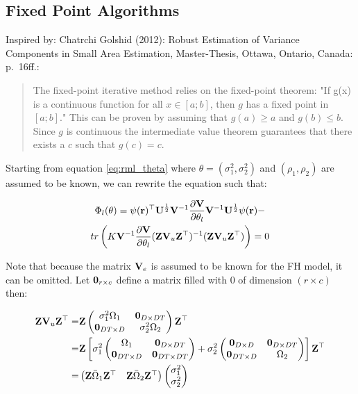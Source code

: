 \subsection{Fixed Point Algorithms}\label{fixed-point-algorithms}

Inspired by: Chatrchi Golshid (2012): Robust Estimation of Variance
Components in Small Area Estimation, Master-Thesis, Ottawa, Ontario,
Canada: p.~16ff.:

\begin{quote}
The fixed-point iterative method relies on the fixed-point theorem: "If g(x) is
a continuous function for all $x \in [a; b]$, then $g$ has a fixed point in $[a;
b]$." This can be proven by assuming that $g(a)\geq a$ and $g(b)\leq b$. Since
$g$ is continuous the intermediate value theorem guarantees that there exists a
$c$ such that $g(c) = c$.
\end{quote}

Starting from equation \ref{eq:rml_theta} where
$\theta = (\sigma_1^2,  \sigma_2^2)$ and $(\rho_1, \rho_2)$ are assumed
to be known, we can rewrite the equation such that:

\begin{multline}
\label{eq:rml_theta_fp}
\Phi_l(\theta) = \psi(\mathbf{r})^\top\mathbf{U}^{\frac{1}{2}}\mathbf{V}^{-1}
\frac{\partial\mathbf{V}}{\partial\theta_l}
\mathbf{V}^{-1}\mathbf{U}^{\frac{1}{2}} \psi(\mathbf{r}) -\\
tr\left(K\mathbf{V}^{-1}\frac{\partial\mathbf{V}}{\partial\theta_l}
(\mathbf{Z}\mathbf{V}_u\mathbf{Z}^\top)^{-1} (\mathbf{Z}\mathbf{V}_u\mathbf{Z}^\top)\right) = 0
\end{multline}

Note that because the matrix $\mathbf{V}_e$ is assumed to be known for the
FH model, it can be omitted. Let $\mathbf{0}_{r\times c}$ define a matrix
filled with $0$ of dimension $(r \times c)$ then:

\begin{align*}
\mathbf{Z}\mathbf{V}_u\mathbf{Z}^\top =& \mathbf{Z}\left(\begin{matrix}
\sigma_1^2\Omega_1 & \mathbf{0}_{D\times DT}\\
\mathbf{0}_{DT\times D} &  \sigma_2^2\Omega_2
\end{matrix}\right)\mathbf{Z}^\top \\
=& \mathbf{Z}
\left[
\sigma_1^2\left(\begin{matrix}
\Omega_1 & \mathbf{0}_{D\times DT} \\
\mathbf{0}_{DT\times D} &  \mathbf{0}_{DT\times DT}
\end{matrix}\right) + 
\sigma_2^2\left(\begin{matrix}
\mathbf{0}_{D\times D} & \mathbf{0}_{D\times DT} \\
\mathbf{0}_{DT\times D} & \Omega_2
\end{matrix}\right)
\right]\mathbf{Z}^\top \\
=& \left(\begin{matrix}\mathbf{Z}\bar{\Omega}_1\mathbf{Z}^\top & \mathbf{Z}\bar{\Omega}_2\mathbf{Z}^\top\end{matrix}\right)
\left(\begin{matrix}
\sigma_1^2 \\
\sigma_2^2
\end{matrix}\right)
\end{align*}

